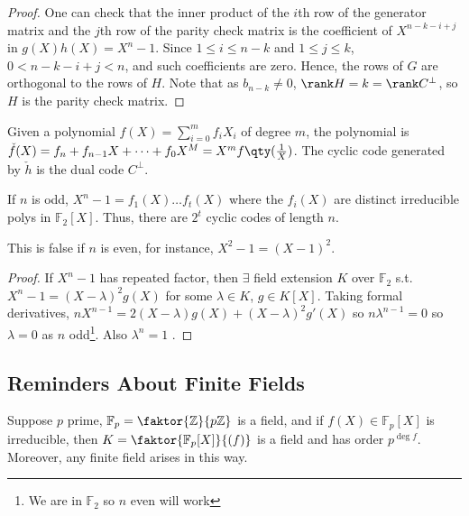 \begin{proof}
    One can check that the inner product of the $i$th row of the generator matrix and the $j$th row of the parity check matrix is the coefficient of $X^{n-k-i+j}$ in $g(X) h(X) = X^n - 1$.
    Since $1 \leq i \leq n - k$ and $1 \leq j \leq k$, $0 < n - k - i + j < n$, and such coefficients are zero.
    Hence, the rows of $G$ are orthogonal to the rows of $H$.
    Note that as $b_{n-k} \neq 0$, $\rank H = k = \rank C^\perp$, so $H$ is the parity check matrix.
\end{proof}

\begin{remark}
    Given a polynomial $f(X) = \sum_{i=0}^m f_i X_i$ of degree $m$, the  polynomial is $\check{f}(X) = f_n + f_{n-1}X + \dots + f_0 X^M = X^m f\qty(\frac{1}{X})$.
    The cyclic code generated by $\check{h}$ is the dual code $C^\perp$.
\end{remark}

\begin{lemma}
    If $n$ is odd, $X^n - 1 = f_1(X) \dots f_t(X)$ where the $f_i(X)$ are distinct irreducible polys in $\mathbb F_2[X]$.
    Thus, there are $2^t$ cyclic codes of length $n$.
\end{lemma}

This is false if $n$ is even, for instance, $X^2 - 1 = (X - 1)^2$.

\begin{proof}
    If $X^n - 1$ has repeated factor, then $\exists$ field extension $K$ over $\mathbb{F}_2$ s.t. $X^n - 1 = (X - \lambda)^2 g(X)$ for some $\lambda \in K$, $g \in K[X]$.
    Taking formal derivatives, $nX^{n-1} = 2(X-\lambda)g(X) + (X-\lambda)^2 g'(X)$ so $n \lambda^{n-1} = 0$ so $\lambda = 0$ as $n$ odd\footnote{We are in $\mathbb{F}_2$ so $n$ even will work}.
    Also $\lambda^n = 1$ \Lightning.
\end{proof}


\subsection{Reminders About Finite Fields}
\begin{theorem}
    Suppose $p$ prime, $\mathbb F_p = \faktor{\mathbb Z}{p\mathbb Z}$ is a field, and if $f(X) \in \mathbb F_p[X]$ is irreducible, then $K = \faktor{\mathbb F_p[X]}{(f)}$ is a field and has order $p^{\deg f}$.
    Moreover, any finite field arises in this way.
\end{theorem}

